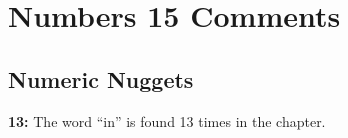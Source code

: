 \section{Numbers 15 Comments}

\subsection{Numeric Nuggets}
\textbf{13: } The word ``in'' is found 13 times in the chapter.